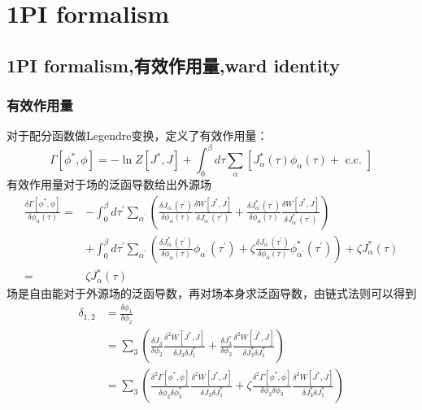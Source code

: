 \documentclass[10pt,openany]{book}
\theoremstyle{thmstyle} %
\theoremstyle{defstyle} %
\theoremstyle{prostyle} %
\begin{document}
\section{1PI formalism}
\subsection{1PI formalism,有效作用量,ward identity}
\subsubsection{有效作用量}
对于配分函数做Legendre变换，定义了有效作用量：
\begin{equation}
  \Gamma\left[\phi^*, \phi\right]=-\ln Z\left[J^*, J\right]+\int_0^\beta d \tau \sum_\alpha\left[J_\alpha^*(\tau) \phi_\alpha(\tau)+\text { c.c. }\right]
\end{equation}         
有效作用量对于场的泛函导数给出外源场
\begin{equation}
  \begin{aligned}
\frac{\delta \Gamma\left[\phi^*, \phi\right]}{\delta \phi_\alpha(\tau)}= & -\int_0^\beta d \tau^{\prime} \sum_{\alpha^{\prime}}\left(\frac{\delta J_{\alpha^{\prime}}\left(\tau^{\prime}\right)}{\delta \phi_\alpha(\tau)} \frac{\delta W\left[J^*, J\right]}{\delta J_{\alpha^{\prime}}\left(\tau^{\prime}\right)}+\frac{\delta J_{\alpha^{\prime}}^*\left(\tau^{\prime}\right)}{\delta \phi_\alpha(\tau)} \frac{\delta W\left[J^*, J\right]}{\delta J_{\alpha^{\prime}}^*\left(\tau^{\prime}\right)}\right) \\
& +\int_0^\beta d \tau^{\prime} \sum_{\alpha^{\prime}}\left(\frac{\delta J_{\alpha^{\prime}}^*\left(\tau^{\prime}\right)}{\delta \phi_\alpha(\tau)} \phi_{\alpha^{\prime}}\left(\tau^{\prime}\right)+\zeta \frac{\delta J_{\alpha^{\prime}}\left(\tau^{\prime}\right)}{\delta \phi_\alpha(\tau)} \phi_{\alpha^{\prime}}^*\left(\tau^{\prime}\right)\right)+\zeta J_\alpha^*(\tau) \\
= & \zeta J_\alpha^*(\tau)
\end{aligned}
\end{equation}
场是自由能对于外源场的泛函导数，再对场本身求泛函导数，由链式法则可以得到
\begin{equation}
  \begin{aligned}
\delta_{1,2} & =\frac{\delta \phi_1}{\delta \phi_2} \\
& =\sum_3\left(\frac{\delta J_3}{\delta \phi_2} \frac{\delta^2 W\left[J^*, J\right]}{\delta J_3 \delta J_1^*}+\frac{\delta J_3^*}{\delta \phi_2} \frac{\delta^2 W\left[J^*, J\right]}{\delta J_3^* \delta J_1^*}\right) \\
& =\sum_3\left(\frac{\delta^2 \Gamma\left[\phi^*, \phi\right]}{\delta \phi_2 \delta \phi_3^*} \frac{\delta^2 W\left[J^*, J\right]}{\delta J_3 \delta J_1^*}+\zeta \frac{\delta^2 \Gamma\left[\phi^*, \phi\right]}{\delta \phi_2 \delta \phi_3} \frac{\delta^2 W\left[J^*, J\right]}{\delta J_3^* \delta J_1^*}\right)
\end{aligned}
\end{equation}
\end{document}
